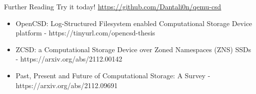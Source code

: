 \documentclass{beamer}
\begin{document}
\begin{frame}{Further Reading}
	\begingroup
	\small Try it today! \underline{\url{https://github.com/Dantali0n/qemu-csd}}
	\begin{itemize}
		\item OpenCSD: Log-Structured Filesystem enabled Computational
		Storage Device platform - https://tinyurl.com/opencsd-thesis
		\item ZCSD: a Computational Storage Device over Zoned Namespaces (ZNS)
			SSDs - https://arxiv.org/abs/2112.00142
		\item Past, Present and Future of Computational Storage: A Survey
			- https://arxiv.org/abs/2112.09691
	\end{itemize}
	\endgroup
\end{frame}
\end{document}
